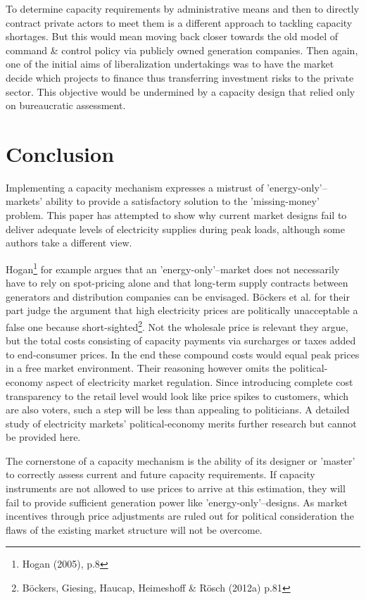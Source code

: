 \documentclass[11pt,a4paper,english]{scrreprt}
\begin{document}
To determine capacity requirements by administrative means and then to directly
contract private actors to meet them is a different approach to tackling
capacity shortages. But this would mean moving back closer towards the old model
of command \& control policy via publicly owned generation companies. Then
again, one of the initial aims of liberalization undertakings was to have
the market decide which projects to finance thus transferring investment risks
to the private sector. This objective would be undermined by a capacity
design that relied only on bureaucratic assessment.\par


 
 
\chapter{Conclusion}


Implementing a capacity mechanism expresses a mistrust of
'energy-only'--markets' ability to provide a satisfactory solution to the
'missing-money' problem. This paper has attempted to show why current market
designs fail to deliver adequate levels of electricity supplies during peak
loads, although some authors take a different view.\par


Hogan\footnote{Hogan (2005), p.8} for example argues that an
'energy-only'--market does not necessarily have to rely on spot-pricing alone
and that long-term supply contracts between generators and distribution
companies can be envisaged. B\"ockers et al. for their part judge the argument
that high electricity prices are politically unacceptable a false one because
short-sighted\footnote{B\"{o}ckers, Giesing, Haucap, Heimeshoff \& R\"{o}sch
(2012a) p.81}. Not the wholesale price is relevant they argue, but the total
costs consisting of capacity payments via surcharges or taxes added to
end-consumer prices. In the end these compound costs would equal peak prices in
a free market environment. Their reasoning however omits the political-economy
aspect of electricity market regulation. Since introducing complete cost
transparency to the retail level would look like price spikes to customers,
which are also voters, such a step will be less than appealing to politicians. A
detailed study of electricity markets' political-economy merits further research
but cannot be provided here.\par


The cornerstone of a capacity mechanism is the ability of its designer or
'master' to correctly assess current and future capacity requirements. If
capacity instruments are not allowed to use prices to arrive at this
estimation, they will fail to provide sufficient generation power like
'energy-only'--designs. As market incentives through price adjustments are ruled
out for political consideration the flaws of the existing market structure will
not be overcome.\par
\end{document}
